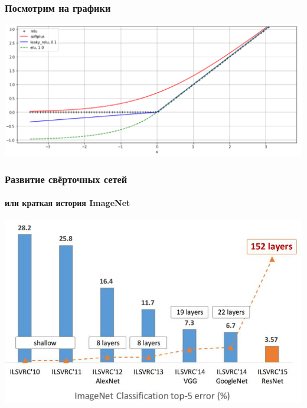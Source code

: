 \documentclass[fullscreen=true, bookmarks=true, hyperref={pdfencoding=unicode}]{beamer}
\begin{document}
\begin{frame}
  \frametitle{Посмотрим на графики}
  \begin{center}
    \includegraphics[keepaspectratio,
                     width=0.7\paperwidth]{relu_softplus.png}
  \end{center}
\end{frame}

\begin{frame}
  \frametitle{Развитие свёрточных сетей}
  \framesubtitle{или краткая история ImageNet}
  \begin{center}
    \includegraphics[keepaspectratio,
                     width=0.7\paperwidth]{image-net-history.jpg}
  \end{center}
\end{frame}
\end{document}
